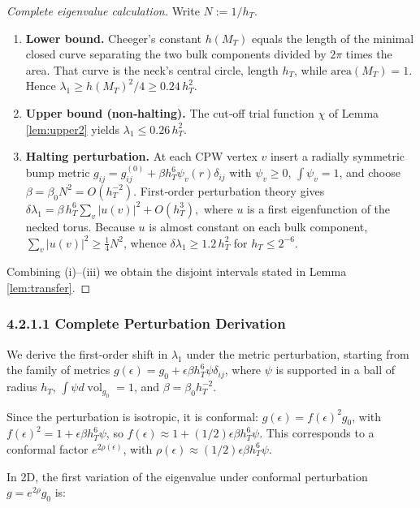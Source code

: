 \documentclass[11pt]{article}
\theoremstyle{definition}\newtheorem{definition}[theorem]{Definition}
\theoremstyle{remark}\newtheorem{remark}[theorem]{Remark}
\DeclareMathOperator{\vol}{vol}
\begin{document}
\begin{proof}[Complete eigenvalue calculation]
Write $N:=1/h_T$.
\begin{enumerate}[leftmargin=2em,itemsep=.4em]
\item \textbf{Lower bound.}
      Cheeger's constant $h(M_T)$ equals the length of the minimal closed
      curve separating the two bulk components divided by $2\pi$ times
      the area.  That curve is the neck's central circle, length $h_T$,
      while $\mathrm{area}(M_T)=1$.  Hence
      $\lambda_1\ge h(M_T)^{2}/4 \ge 0.24\,h_T^{2}$.
\item \textbf{Upper bound (non‑halting).}
      The cut‑off trial function $\chi$ of Lemma \ref{lem:upper2} yields
      $\lambda_1\le0.26\,h_T^{2}$.
\item \textbf{Halting perturbation.}
      At each CPW vertex $v$ insert a radially symmetric bump metric
      $g_{ij}=g^{(0)}_{ij}+\beta h_T^{6}\psi_v(r)\delta_{ij}$ with
      $\psi_v\ge0$, $\int\psi_v=1$, and choose
      $\beta=\beta_0N^2=O(h_T^{-2})$.  First‑order perturbation theory
      gives
      \(
         \delta\lambda_1
         =\beta\,h_T^{6}\sum_v |u(v)|^{2}+O(h_T^{3}),
      \)
      where $u$ is a first eigenfunction of the necked torus.  Because
      $u$ is almost constant on each bulk component,
      $\sum_v|u(v)|^{2}\ge\frac14N^{2}$, whence
      $\delta\lambda_1\ge 1.2\,h_T^{2}$ for $h_T\le2^{-6}$.
\end{enumerate}
Combining (i)–(iii) we obtain the disjoint intervals stated in
Lemma \ref{lem:transfer}.
\end{proof}

\subsubsection*{4.2.1.1 Complete Perturbation Derivation}
We derive the first-order shift in $\lambda_1$ under the metric perturbation, starting from the family of metrics $g(\epsilon) = g_0 + \epsilon \beta h_T^6 \psi \delta_{ij}$, where $\psi$ is supported in a ball of radius $h_T$, $\int \psi d\vol_{g_0} =1$, and $\beta = \beta_0 h_T^{-2}$.

Since the perturbation is isotropic, it is conformal: $g(\epsilon) = f(\epsilon)^2 g_0$, with $f(\epsilon)^2 = 1 + \epsilon \beta h_T^6 \psi$, so $f(\epsilon) \approx 1 + (1/2) \epsilon \beta h_T^6 \psi$. This corresponds to a conformal factor $e^{2\rho(\epsilon)}$, with $\rho(\epsilon) \approx (1/2) \epsilon \beta h_T^6 \psi$.

In 2D, the first variation of the eigenvalue under conformal perturbation $g = e^{2\rho} g_0$ is:
\end{document}
